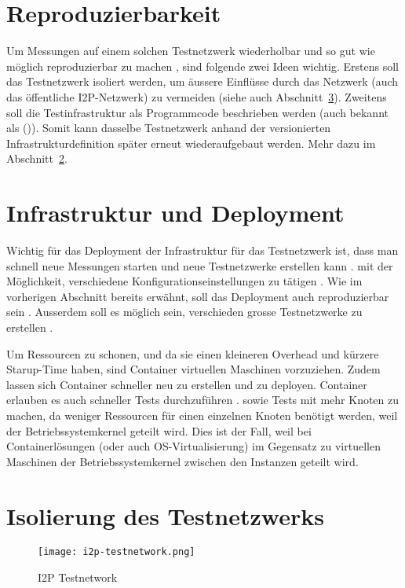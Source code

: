 \section{Reproduzierbarkeit}

Um Messungen auf einem solchen Testnetzwerk wiederholbar und so gut wie möglich reproduzierbar zu machen , sind folgende zwei Ideen wichtig.
Erstens soll das Testnetzwerk isoliert werden, um äussere Einflüsse durch das Netzwerk (auch das öffentliche I2P-Netzwerk) zu vermeiden (siehe auch Abschnitt~\ref{sec:isolierung}).
Zweitens soll die Testinfrastruktur als Programmcode beschrieben werden (auch bekannt als  ()).
Somit kann dasselbe Testnetzwerk anhand der versionierten Infrastrukturdefinition später erneut wiederaufgebaut werden.
Mehr dazu im Abschnitt~\ref{sec:infrastructure}.

\section{Infrastruktur und Deployment}\label{sec:infrastructure}

Wichtig für das Deployment der Infrastruktur für das Testnetzwerk ist, dass man schnell neue Messungen starten und neue Testnetzwerke erstellen kann .
mit der Möglichkeit, verschiedene Konfigurationseinstellungen zu tätigen .
Wie im vorherigen Abschnitt bereits erwähnt, soll das Deployment auch reproduzierbar sein .
Ausserdem soll es möglich sein, verschieden grosse Testnetzwerke zu erstellen .

Um Ressourcen zu schonen, und da sie einen kleineren Overhead und kürzere Starup-Time haben, sind Container virtuellen Maschinen vorzuziehen.
Zudem lassen sich Container schneller neu zu erstellen und zu deployen.
Container erlauben es auch schneller Tests durchzuführen . 
sowie Tests mit mehr Knoten zu machen, da weniger Ressourcen für einen einzelnen Knoten benötigt werden, weil der Betriebssystemkernel geteilt wird.
Dies ist der Fall, weil bei Containerlösungen (oder auch OS-Virtualisierung) im Gegensatz zu virtuellen Maschinen der Betriebssystemkernel zwischen den Instanzen geteilt wird.

\section{Isolierung des Testnetzwerks}
\label{sec:isolierung}

\begin{figure*}[htp]
  \texttt{[image: i2p-testnetwork.png]}
  \caption{I2P Testnetwork}\label{fig:i2p-testnetwork}
\end{figure*}

